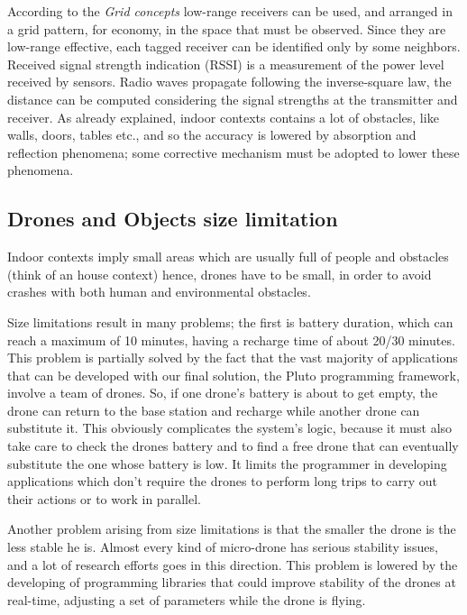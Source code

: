 According to the \textit{Grid concepts} low-range receivers can be used, and arranged in a grid pattern, for economy, in the space that must be observed.
Since they are low-range effective, each tagged receiver can be identified only by some neighbors.
\\

Received signal strength indication (RSSI) is a measurement of the power level received by sensors.
Radio waves propagate following the inverse-square law, the distance can be computed considering the signal strengths at the transmitter and receiver.
As already explained, indoor contexts contains a lot of obstacles, like walls, doors, tables etc., and so the accuracy is lowered by absorption and reflection phenomena; some corrective mechanism must be adopted to lower these phenomena.

\newpage

\subsection{Drones and Objects size limitation}


Indoor contexts imply small areas which are usually full of people and obstacles (think of an house context) hence, drones have to be small, in order to avoid crashes with both human and environmental obstacles.

Size limitations result in many problems; the first is battery duration, which can reach a maximum of 10 minutes, having a recharge time of about 20/30 minutes.
This problem is partially solved by the fact that the vast majority of applications that can be developed with our final solution, the Pluto programming framework, involve a team of drones. 
So, if one drone's battery is about to get empty, the drone can return to the base station and recharge while another drone can substitute it.
This obviously complicates the system's logic, because it must also take care to check the drones battery and to find a free drone that can eventually substitute the one whose battery is low.
It limits the programmer in developing applications which don't require the drones to perform long trips to carry out their actions or to work in parallel.

Another problem arising from size limitations is that the smaller the drone is the less stable he is.
Almost every kind of micro-drone has serious stability issues, and a lot of research efforts goes in this direction. This problem is lowered by the developing of programming libraries that could improve stability of the drones at real-time, adjusting a set of parameters while the drone is flying.

